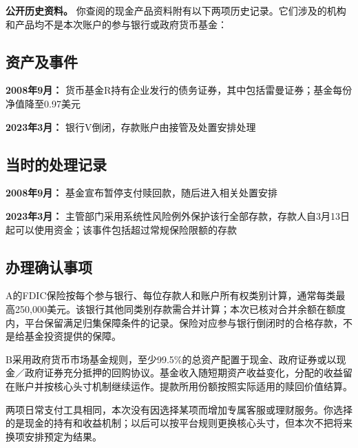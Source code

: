 \documentclass[UTF8,fontset=none,11pt,a4paper]{ctexart}
\begin{document}
\textbf{公开历史资料。} 你查阅的现金产品资料附有以下两项历史记录。它们涉及的机构和产品均不是本次账户的参与银行或政府货币基金：


\subsection*{资产及事件}
\textbf{2008年9月：} 货币基金R持有企业发行的债务证券，其中包括雷曼证券；基金每份净值降至0.97美元


\textbf{2023年3月：} 银行V倒闭，存款账户由接管及处置安排处理


\subsection*{当时的处理记录}
\textbf{2008年9月：} 基金宣布暂停支付赎回款，随后进入相关处置安排


\textbf{2023年3月：} 主管部门采用系统性风险例外保护该行全部存款，存款人自3月13日起可以使用资金；该事件包括超过常规保险限额的存款


\subsection*{办理确认事项}
A的FDIC保险按每个参与银行、每位存款人和账户所有权类别计算，通常每类最高250,000美元。该银行其他同类别存款需合并计算；本次已核对合并余额在额度内，平台保留满足归集保障条件的记录。保险对应参与银行倒闭时的合格存款，不是给基金投资提供的保障。


B采用政府货币市场基金规则，至少99.5\%的总资产配置于现金、政府证券或以现金／政府证券充分抵押的回购协议。基金收入随短期资产收益变化，分配的收益留在账户并按核心头寸机制继续运作。提款所用份额按照实际适用的赎回价值结算。


两项日常支付工具相同，本次没有因选择某项而增加专属客服或理财服务。你选择的是现金的持有和收益机制；以后可以按平台规则更换核心头寸，但本次不把将来换项安排预定为结果。
\end{document}

